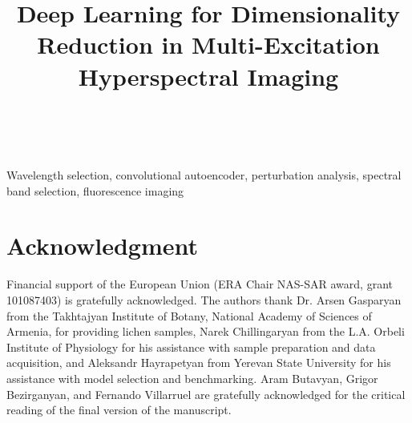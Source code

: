 \documentclass[journal]{IEEEtran}
\begin{document}
\title{Deep Learning for Dimensionality Reduction in Multi-Excitation Hyperspectral Imaging}

\author{

\\
}

\maketitle



\begin{IEEEkeywords}
Wavelength selection, convolutional autoencoder, perturbation analysis, spectral band selection, fluorescence imaging
\end{IEEEkeywords}


% 






\section*{Acknowledgment}
Financial support of the European Union (ERA Chair NAS-SAR award, grant 101087403) is gratefully acknowledged. The authors thank Dr. Arsen Gasparyan from the Takhtajyan Institute of Botany, National Academy of Sciences of Armenia, for providing lichen samples, Narek Chillingaryan from the L.A. Orbeli Institute of Physiology for his assistance with sample preparation and data acquisition, and Aleksandr Hayrapetyan from Yerevan State University for his assistance with model selection and benchmarking. Aram Butavyan, Grigor Bezirganyan, and Fernando Villarruel are gratefully acknowledged for the critical reading of the final version of the manuscript.
\end{document}
